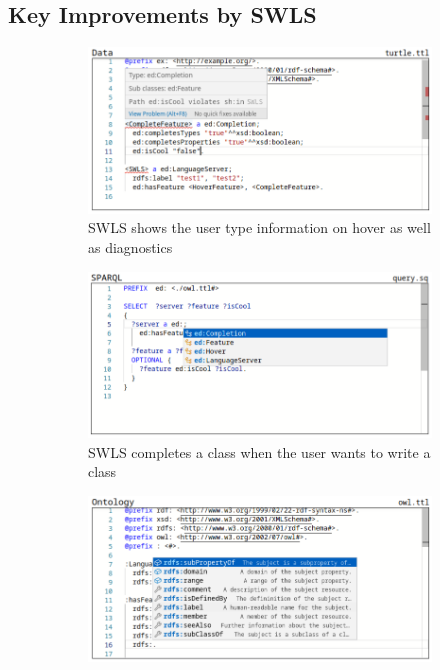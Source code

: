 \subsection{Key Improvements by SWLS}

\begin{figure}[tb]
    \centering
    \begin{subfigure}{0.48\textwidth}
      \includegraphics[width=\textwidth]{./images/hover.png}
      \caption{SWLS shows the user type information on hover as well as diagnostics}
      \label{hover}
    \end{subfigure}
    \hfill
    \begin{subfigure}{0.48\textwidth}
      \includegraphics[width=\textwidth]{./images/class.png}
      \caption{SWLS completes a class when the user wants to write a class}
      \label{class_completion}
    \end{subfigure}
    \hfill
    \begin{subfigure}{0.48\textwidth}
      \includegraphics[width=\textwidth]{./images/property.png}

\end{subfigure}
\end{figure}
